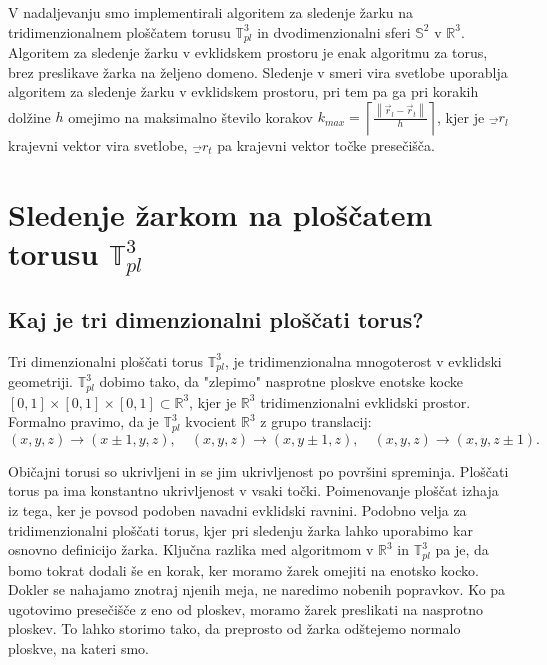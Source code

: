 \documentclass[titlepage]{article}
\begin{document}
\bigskip
V nadaljevanju smo implementirali algoritem za sledenje žarku na tridimenzionalnem ploščatem torusu $\mathbb{T}_{pl}^{3}$ in dvodimenzionalni sferi $\mathbb{S}^2$ v $\mathbb{R}^3$. Algoritem za sledenje žarku v evklidskem prostoru je enak algoritmu za torus, brez preslikave žarka na željeno domeno. Sledenje v smeri vira svetlobe uporablja algoritem za sledenje žarku v evklidskem prostoru, pri tem pa ga pri korakih dolžine $h$ omejimo na maksimalno število korakov
$k_{max}= \left \lceil \frac{\left \|\vec{r}_{l}-\vec{r}_{t} \right \|}{h} \right \rceil$, kjer je $\vec_{r}_{l}$ krajevni vektor vira svetlobe,
$\vec_{r}_{t}$ pa krajevni vektor točke presečišča.

\section{Sledenje žarkom na ploščatem torusu $\mathbb{T}_{pl}^{3}$} 

\subsection{Kaj je tri dimenzionalni ploščati torus?}
Tri dimenzionalni ploščati torus \( \mathbb{T}^3_{pl} \), je tridimenzionalna mnogoterost v evklidski geometriji. \( \mathbb{T}^3_{pl} \) dobimo tako, da "zlepimo" nasprotne ploskve enotske kocke \([0,1] \times [0,1] \times [0,1] \subset \mathbb{R}^3 \), kjer je \(\mathbb{R}^3\) tridimenzionalni evklidski prostor. Formalno pravimo, da je \( \mathbb{T}^3_{pl} \) kvocient \(\mathbb{R}^3\) z grupo translacij:
\begin{equation}
(x, y, z) \to (x \pm 1, y, z), \quad (x, y, z) \to (x, y \pm 1, z), \quad (x, y, z) \to (x, y, z \pm 1).
\end{equation}

Običajni torusi so ukrivljeni in se jim ukrivljenost po površini spreminja. Ploščati torus pa ima konstantno ukrivljenost v vsaki točki. Poimenovanje ploščat izhaja iz tega, ker je povsod podoben navadni evklidski ravnini. Podobno velja za tridimenzionalni ploščati torus, kjer pri sledenju žarka lahko uporabimo kar osnovno definicijo žarka. Ključna razlika med algoritmom v \( \mathbb{R}^3 \) in \( \mathbb{T}^3_{pl} \) pa je, da bomo tokrat dodali še en korak, ker moramo žarek omejiti na enotsko kocko. Dokler se nahajamo znotraj njenih meja, ne naredimo nobenih popravkov. Ko pa ugotovimo presečišče z eno od ploskev, moramo žarek preslikati na nasprotno ploskev. To lahko storimo tako, da preprosto od žarka odštejemo normalo ploskve, na kateri smo.
\end{document}
